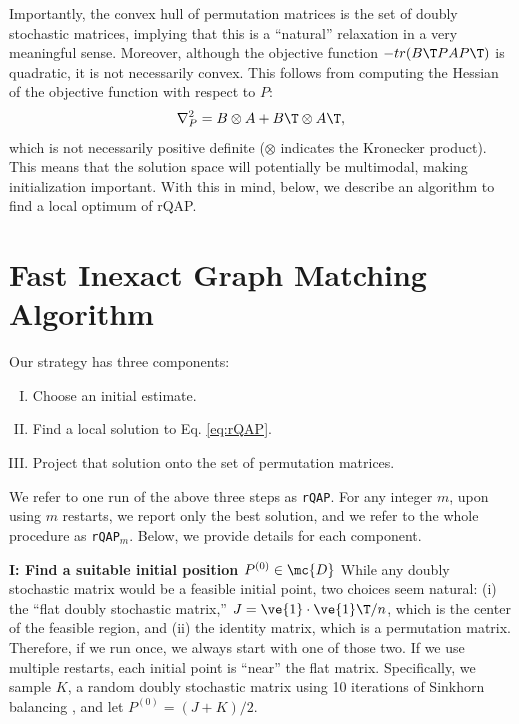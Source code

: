 \documentclass[10pt,journal,cspaper,compsoc]{IEEEtran}
\begin{document}
Importantly, the convex hull of permutation matrices is the set of doubly stochastic matrices, implying that this is a ``natural'' relaxation in a very meaningful sense.    Moreover, although the objective function $- tr(B\T PAP\T)$ is quadratic, it is not necessarily convex.  This follows from computing the Hessian of the objective function with respect to $P$:
\begin{align}
	\nabla_P^2  =  B \otimes A + B\T \otimes A\T,
\end{align}
which is not necessarily positive definite ($\otimes$ indicates the Kronecker product). This means that the solution space will potentially be multimodal, making initialization important.  With this in mind, below, we describe an algorithm to find a local optimum of rQAP.


\section{Fast Inexact Graph Matching Algorithm} %
\label{ssub:graph_matching}


Our strategy has three components:
\begin{enumerate}[I.]
	\item Choose an initial estimate.
	\item Find a local solution to Eq. \eqref{eq:rQAP}.
	\item Project that solution onto the set of permutation matrices.
\end{enumerate}
We refer to one run of the above three steps as \texttt{rQAP}.  For any integer $m$, upon using $m$ restarts, we report only the best solution, and we refer to the whole procedure as \texttt{rQAP}$_m$.  Below, we provide details for each component.

\textbf{I: Find a suitable initial position $P^{(0)} \in \mc{D}$}  While any doubly stochastic matrix would be a feasible initial point, two choices seem natural: (i) the ``flat doubly  stochastic matrix,'' $J=\ve{1} \cdot \ve{1}\T/n$, which is the center of the feasible region, and (ii) the identity matrix, which is a permutation matrix.  Therefore, if we run \rqap  once, we always start with one of those two.  If we use multiple restarts, each initial point is ``near'' the flat matrix.  Specifically, we sample $K$, a random doubly stochastic matrix using 10 iterations of Sinkhorn balancing \cite{Sinkhorn1964}, and let $P^{(0)}=(J+K)/2$. %
\end{document}
